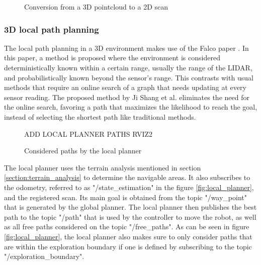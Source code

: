 \documentclass[11pt]{article}
\begin{document}
        \begin{figure}[h]
            \centering
            \resizebox{0.75\textwidth}{!}{%
            
            }   
            \caption{Conversion from a 3D pointcloud to a 2D scan}
            \label{fig:pointcloud_to_laserscan}
        \end{figure}
        
        
        \subsubsection{3D local path planning}
        \label{section:local_path_planning}

        The local path planning in a 3D environment makes use of the Falco paper \cite{zhang2020falco}. In this paper, a method is proposed where the environment is considered deterministically known within a certain range, usually the range of the LIDAR, and probabilistically known beyond the sensor's range. This contrasts with usual methods that require an online search of a graph that needs updating at every sensor reading. The proposed method by Ji Shang et al. eliminates the need for the online search, favoring a path that maximizes the likelihood to reach the goal, instead of selecting the shortest path like traditional methods.

        \begin{figure}[H]
            \centering
            \color{red}
            ADD LOCAL PLANNER PATHS RVIZ2
            \caption{Considered paths by the local planner}
        \end{figure}


        The local planner uses the terrain analysis mentioned in section \ref{section:terrain_analysis} to determine the navigable areas. It also subscribes to the odometry, referred to as "/state\_estimation" in the figure \ref{fig:local_planner}, and the registered scan. Its main goal is obtained from the topic "/way\_point" that is generated by the global planner. The local planner then publishes the best path to the topic "/path" that is used by the controller to move the robot, as well as all free paths considered on the topic "/free\_paths". As can be seen in figure \ref{fig:local_planner}, the local planner also makes sure to only consider paths that are within the exploration boundary if one is defined by subscribing to the topic "/exploration\_boundary".
\end{document}
